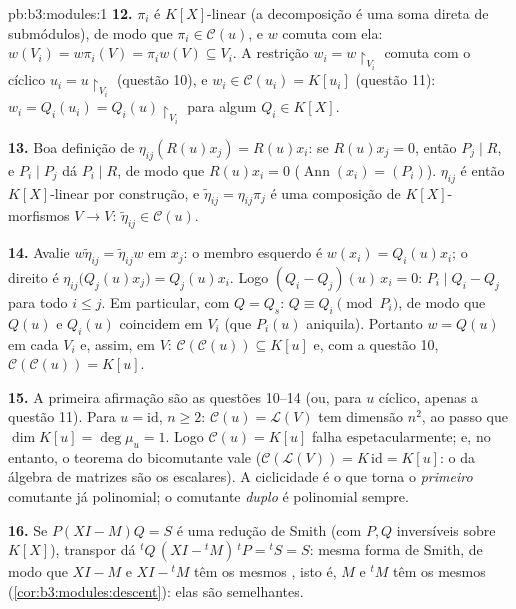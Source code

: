 \begin{solution}{pb:b3:modules:1}
\textbf{12.} $\pi_i$ é $K[X]$-linear (a decomposição é uma soma
direta de submódulos), de modo que $\pi_i \in \mathcal C(u)$, e $w$ comuta com ela:
$w(V_i) = w\pi_i(V) = \pi_i w(V) \subseteq
V_i$. A restrição $w_i = w\restriction_{V_i}$ comuta com o cíclico $u_i = u\restriction_{V_i}$ (questão 10), e $w_i
\in \mathcal C(u_i) = K[u_i]$
(questão 11): $w_i = Q_i(u_i) =
Q_i(u)\restriction_{V_i}$ para algum $Q_i \in K[X]$.

\textbf{13.} Boa definição de $\eta_{ij}(R(u)x_j) = R(u)x_i$: se $R(u)x_j = 0$, então $P_j \mid R$, e $P_i \mid P_j$ dá
$P_i \mid R$, de modo que $R(u)x_i = 0$ ($\operatorname{Ann}(x_i) =
(P_i)$). $\eta_{ij}$ é então $K[X]$-linear por
construção, e $\tilde\eta_{ij} = \eta_{ij}\pi_j$ é uma composição de $K[X]$-morfismos $V \to V$: $\tilde\eta_{ij} \in \mathcal
C(u)$.

\textbf{14.} Avalie $w\tilde\eta_{ij} = \tilde\eta_{ij}w$ em $x_j$: o membro esquerdo é $w(x_i) = Q_i(u)x_i$; o
direito é $\eta_{ij}\bigl(Q_j(u)x_j\bigr) = Q_j(u)x_i$. Logo $(Q_i -
Q_j)(u)\,x_i = 0$: $P_i \mid Q_i - Q_j$ para todo $i \leq j$. Em particular, com
$Q = Q_s$: $Q \equiv Q_i \pmod{P_i}$, de modo que $Q(u)$ e $Q_i(u)$ coincidem em $V_i$
(que $P_i(u)$ aniquila). Portanto $w
= Q(u)$ em cada $V_i$ e, assim,
em $V$: $\mathcal C(\mathcal C(u))
\subseteq K[u]$ e, com a questão 10, $\mathcal C(\mathcal
C(u)) = K[u]$.

\textbf{15.} A primeira afirmação são as questões 10--14 (ou, para
$u$ cíclico, apenas a questão 11). Para $u = \mathrm{id}$, $n \geq
2$: $\mathcal C(u) = \mathcal L(V)$ tem
dimensão $n^2$, ao passo que $\dim K[u] = \deg\mu_u = 1$. Logo $\mathcal C(u) = K[u]$ falha
espetacularmente; e, no entanto, o teorema do bicomutante vale ($\mathcal C(\mathcal L(V)) = K\,\mathrm{id} = K[u]$: o
 da álgebra de matrizes são os escalares). A ciclicidade é o que
torna o \emph{primeiro} comutante já polinomial; o comutante
\emph{duplo} é polinomial sempre.

\textbf{16.} Se $P(XI - M)Q = S$ é uma redução de Smith (com $P, Q$ inversíveis
sobre $K[X]$), transpor dá ${}^tQ\,(XI -
{}^tM)\,{}^tP = {}^tS = S$: mesma forma de Smith, de modo que
$XI - M$ e $XI - {}^tM$ têm os mesmos , isto é, $M$ e
${}^tM$ têm os mesmos 
(\cref{cor:b3:modules:descent}): elas são semelhantes.


\end{solution}
